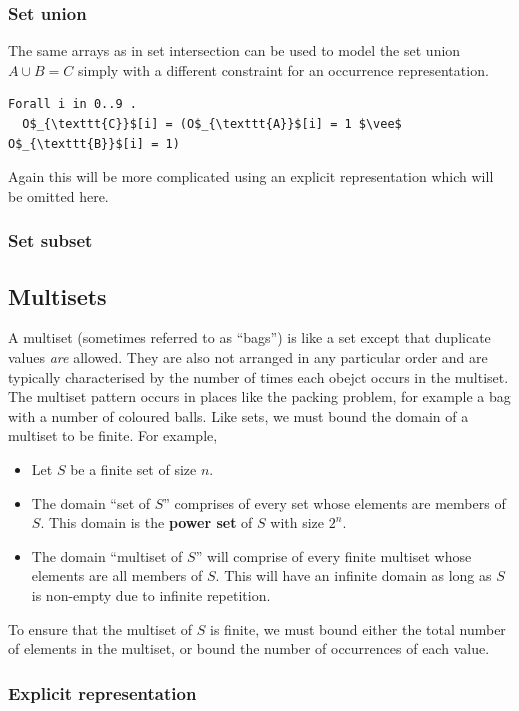 \documentclass[CS4402-Notes.tex]{subfiles}
\begin{document}
\subsubsection{Set union}
The same arrays as in set intersection can be used to model the set union $A \cup B  = C$ simply with a different constraint for an occurrence representation.
\begin{lstlisting}
Forall i in 0..9 . 
  O$_{\texttt{C}}$[i] = (O$_{\texttt{A}}$[i] = 1 $\vee$ O$_{\texttt{B}}$[i] = 1)
\end{lstlisting}
Again this will be more complicated using an explicit representation which will be omitted here.

\subsubsection{Set subset}

\subsection{Multisets}
A multiset (sometimes referred to as ``bags'') is like a set except that duplicate values \textit{are} allowed. They are also not arranged in any particular order and are typically characterised by the number of times each obejct occurs in the multiset. The multiset pattern occurs in places like the packing problem, for example a bag with a number of coloured balls.
\n
Like sets, we must bound the domain of a multiset to be finite. For example,
\begin{itemize}
\item Let $S$ be a finite set of size $n$.
\item The domain ``set of $S$'' comprises of every set whose elements are members of $S$. This domain is the \textbf{power set} of $S$ with size $2^{n}$.
\item The domain ``multiset of $S$'' will comprise of every finite multiset whose elements are all members of $S$. This will have an infinite domain as long as $S$ is non-empty due to infinite repetition.
\end{itemize}
To ensure that the multiset of $S$ is finite, we must bound either the total number of elements in the multiset, or bound the number of occurrences of each value.

\subsubsection{Explicit representation}
\end{document}
